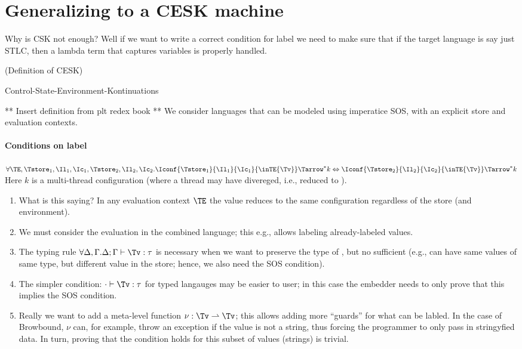 \section{Generalizing to a CESK machine}
\label{sec:cesk}

Why is CSK not enough? Well if we want to write a correct condition
for label we need to make sure that if the target language is say just
STLC, then a lambda term that captures variables is properly handled.

(Definition of CESK)

Control-State-Environment-Kontinuations

** Insert definition from plt redex book **
We consider languages that can be modeled using imperatice SOS, with
an explicit store and evaluation contexts.




\paragraph{Conditions on label}
$\forall
\TE,
\Tstore_1, \Il_1, \Ic_1,
\Tstore_2, \Il_2, \Ic_2.
\Iconf{\Tstore_1}{\Il_1}{\Ic_1}{\inTE{\Tv}} \Tarrow^* k
\Leftrightarrow              
\Iconf{\Tstore_2}{\Il_2}{\Ic_2}{\inTE{\Tv}} \Tarrow^* k
$
Here $k$ is a multi-thread configuration (where a thread may have
divereged, i.e., reduced to \diverge).

\begin{enumerate}
 \item What is this saying? In any evaluation context $\TE$ the value
 \Tv reduces to the same configuration regardless of the store (and
 environment).
 \item We must consider the evaluation in the combined language; this
 e.g., allows labeling already-labeled values.
 \item The typing rule $\forall \Delta, \Gamma. \Delta;\Gamma \vdash
 \Tv : \tau$ is necessary when we want to preserve the type of \Tv,
 but no sufficient (e.g., can have same values of same type, but
 different value in the store; hence, we also need the SOS condition).
 \item The simpler condition: $\cdot \vdash \Tv : \tau$ for typed
 langauges may be easier to user; in this case the embedder needs to
 only prove that this implies the SOS condition.
 \item Really we want to add a meta-level function $\nu: \Tv
 \rightharpoonup \Tv$; this allows adding more ``guards'' for what can
 be labled. In the case of Browbound, $\nu$ can, for example, throw an
 exception if the value is not a string, thus forcing the programmer
 to only pass in stringyfied data. In turn, proving that the condition
 holds for this subset of values (strings) is trivial.
 
\end{enumerate}

